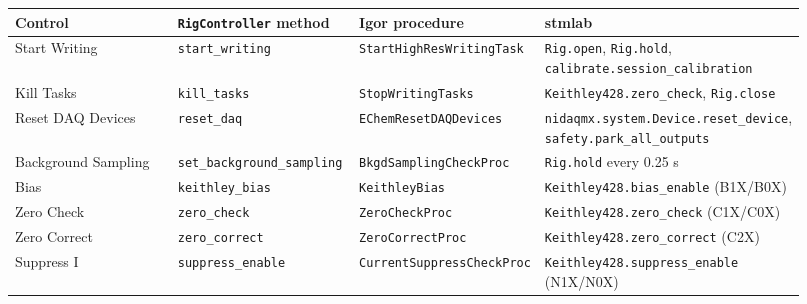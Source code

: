 \small\setlength{\LTleft}{0pt}\setlength{\LTright}{\fill}
\begin{longtable}{@{}>{\raggedright\arraybackslash}p{0.230\linewidth}>{\raggedright\arraybackslash}p{0.230\linewidth}>{\raggedright\arraybackslash}p{0.230\linewidth}>{\raggedright\arraybackslash}p{0.230\linewidth}@{}}
\toprule
\textbf{Control} & \textbf{\texttt{Rig\discretionary{}{}{}Controller} method} & \textbf{Igor procedure} & \textbf{stmlab} \\
\midrule\endhead
Start Writing & \texttt{start\_\discretionary{}{}{}writing} & \texttt{Start\discretionary{}{}{}High\discretionary{}{}{}Res\discretionary{}{}{}Writing\discretionary{}{}{}Task} & \texttt{Rig.\discretionary{}{}{}open}, \texttt{Rig.\discretionary{}{}{}hold}, \texttt{calibrate.\discretionary{}{}{}session\_\discretionary{}{}{}calibration} \\
Kill Tasks & \texttt{kill\_\discretionary{}{}{}tasks} & \texttt{Stop\discretionary{}{}{}Writing\discretionary{}{}{}Tasks} & \texttt{Keithley428.\discretionary{}{}{}zero\_\discretionary{}{}{}check}, \texttt{Rig.\discretionary{}{}{}close} \\
Reset DAQ Devices & \texttt{reset\_\discretionary{}{}{}daq} & \texttt{EChem\discretionary{}{}{}Reset\discretionary{}{}{}DAQDevices} & \texttt{nidaqmx.\discretionary{}{}{}system.\discretionary{}{}{}Device.\discretionary{}{}{}reset\_\discretionary{}{}{}device}, \texttt{safety.\discretionary{}{}{}park\_\discretionary{}{}{}all\_\discretionary{}{}{}outputs} \\
Background Sampling & \texttt{set\_\discretionary{}{}{}background\_\discretionary{}{}{}sampling} & \texttt{Bkgd\discretionary{}{}{}Sampling\discretionary{}{}{}Check\discretionary{}{}{}Proc} & \texttt{Rig.\discretionary{}{}{}hold} every 0.25 s \\
Bias & \texttt{keithley\_\discretionary{}{}{}bias} & \texttt{Keithley\discretionary{}{}{}Bias} & \texttt{Keithley428.\discretionary{}{}{}bias\_\discretionary{}{}{}enable} (B1X/B0X) \\
Zero Check & \texttt{zero\_\discretionary{}{}{}check} & \texttt{Zero\discretionary{}{}{}Check\discretionary{}{}{}Proc} & \texttt{Keithley428.\discretionary{}{}{}zero\_\discretionary{}{}{}check} (C1X/C0X) \\
Zero Correct & \texttt{zero\_\discretionary{}{}{}correct} & \texttt{Zero\discretionary{}{}{}Correct\discretionary{}{}{}Proc} & \texttt{Keithley428.\discretionary{}{}{}zero\_\discretionary{}{}{}correct} (C2X) \\
Suppress I & \texttt{suppress\_\discretionary{}{}{}enable} & \texttt{Current\discretionary{}{}{}Suppress\discretionary{}{}{}Check\discretionary{}{}{}Proc} & \texttt{Keithley428.\discretionary{}{}{}suppress\_\discretionary{}{}{}enable} (N1X/N0X) \\

\end{longtable}
